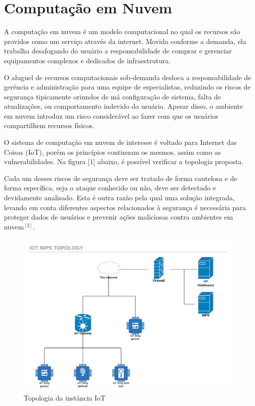 \documentclass[journal]{IEEEtran}
\begin{document}
\section{Computação em Nuvem}
A computação em nuvem é um modelo computacional no qual os recursos são providos como um serviço através da internet. Movida conforme a demanda, ela trabalha desafogando do usuário a responsabilidade de comprar e gerenciar equipamentos complexos e dedicados de infraestrutura. \par
O aluguel de recursos computacionais sob-demanda desloca a responsabilidade de gerência e administração para uma equipe de especialistas, reduzindo os riscos de segurança tipicamente oriundos de má configuração de sistema, falta de atualizações, ou comportamento indevido do usuário. Apesar disso, o ambiente em nuvem introduz um risco considerável ao fazer com que os usuários compartilhem recursos físicos. \par
O sistema de computação em nuvem de interesse é voltado para Internet das Coisas (IoT), porém os princípios continuam os mesmos, assim como as vulnerabilidades. Na figura [1] abaixo, é possível verificar a topologia proposta. \par
Cada um desses riscos de segurança deve ser tratado de forma cautelosa e de forma específica, seja o ataque conhecido ou não, deve ser detectado e devidamente analisado. Esta é outra razão pela qual uma solução integrada, levando em conta diferentes aspectos relacionados à segurança é necessária para proteger dados de usuários e prevenir ações maliciosas contra ambientes em nuvem$^{ [2] }$.

\begin{figure}[h!]
	\includegraphics[width=\linewidth]{IoT_NIPS_topology_firewall.png}
	\caption{Topologia da instância IoT}
	\label{fig:NIPS_IoT_Topology}
\end{figure}
\end{document}
